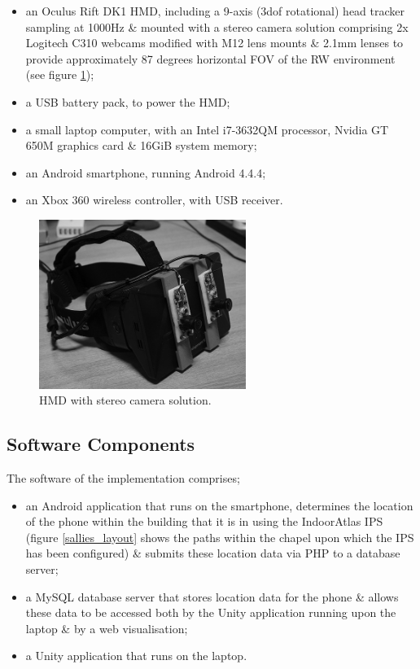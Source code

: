 \begin{itemize}
	\item an Oculus Rift DK1 HMD, including a 9-axis (3dof rotational) head tracker sampling at 1000Hz \& mounted with a stereo camera solution comprising 2x Logitech C310 webcams modified with M12 lens mounts \& 2.1mm lenses to provide approximately 87 degrees horizontal FOV of the RW environment (see figure \ref{rift});
	\item a USB battery pack, to power the HMD;
	\item a small laptop computer, with an Intel i7-3632QM processor, Nvidia GT 650M graphics card \& 16GiB system memory;
	\item an Android smartphone, running Android 4.4.4;
	\item an Xbox 360 wireless controller, with USB receiver.
\end{itemize}

\begin{figure}[h]
	\begin{center}
		\includegraphics[width=0.6\textwidth]{images/rift.png}
		\caption{HMD with stereo camera solution.}
		\label{rift}
	\end{center}
\end{figure}

\subsection{Software Components}
The software of the implementation comprises;

\begin{itemize}
	\item an Android application that runs on the smartphone, determines the location of the phone within the building that it is in using the IndoorAtlas IPS~\cite{IndoorAtlasLtd.2012} (figure \ref{sallies_layout} shows the paths within the chapel upon which the IPS has been configured) \& submits these location data via PHP to a database server;
	\item a MySQL database server that stores location data for the phone \& allows these data to be accessed both by the Unity application running upon the laptop \& by a web visualisation;
	\item a Unity application that runs on the laptop.
\end{itemize}

